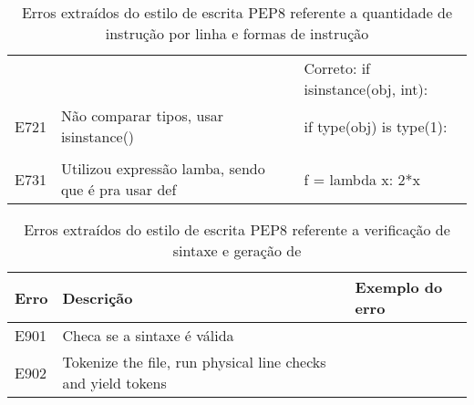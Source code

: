 \begin{table}
\begin{tabularx}{\linewidth}{ |l|X|X| }
			& 
			&  \\
			\hline
			
			& 
			& Correto: if isinstance(obj, int): \\
			\hline
			E721 
			& Não comparar tipos, usar isinstance() 
			& if type(obj) is type(1): \\
			\hline
			
			& 
			&  \\
			\hline
			E731
			& Utilizou expressão lamba, sendo que é pra usar def
			& f = lambda x: 2*x \\
			\hline
		\end{tabularx}
		\caption{Erros extraídos do estilo de escrita PEP8 referente a quantidade de instrução por linha e formas de instrução}
		\label{tab:pep8E700}
	\end{table}

	\begin{table}
		\scriptsize
		\begin{tabularx}{\linewidth}{ |l|X|X| }
			\hline
			\textbf{Erro}
			& \textbf{Descrição}
			& \textbf{Exemplo do erro} \\
			\hline
			E901 
			& Checa se a sintaxe é válida 
			&  \\
			\hline
			E902 
			& Tokenize the file, run physical line checks and yield tokens 
			&  \\
			\hline
		\end{tabularx}
		\caption{Erros extraídos do estilo de escrita PEP8 referente a verificação de sintaxe e geração de }
		\label{tab:pep8E900}
	\end{table}